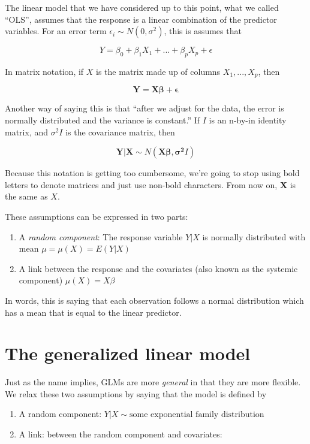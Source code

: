 \documentclass[openany]{book}
\begin{document}
The linear model that we have considered up to this point, what we called ``OLS'', assumes that the response is a linear combination of the predictor variables. For an error term \(\epsilon_i \sim N(0,\sigma^2)\), this is assumes that

\[
Y = \beta_0 + \beta_1 X_1 + ... + \beta_p X_p + \epsilon
\]

In matrix notation, if \(X\) is the matrix made up of columns \(X_1, ..., X_p\), then

\[
\mathbf{Y} = \mathbf{X} \mathbf{\beta} + \mathbf{\epsilon}
\]

Another way of saying this is that ``after we adjust for the data, the error is normally distributed and the variance is constant.'' If \(I\) is an n-by-in identity matrix, and \(\sigma^2 I\) is the covariance matrix, then

\[
\mathbf{Y|X} \sim N( \mathbf{X \beta}, \mathbf{\sigma^2} I)
\]

Because this notation is getting too cumbersome, we're going to stop using bold letters to denote matrices and just use non-bold characters. From now on, \(\mathbf{X}\) is the same as \(X\).

These assumptions can be expressed in two parts:

\begin{enumerate}
\def\labelenumi{\arabic{enumi}.}
\item
  A \emph{random component}: The response variable \(Y|X\) is normally distributed with mean \(\mu = \mu(X) = E(Y|X)\)
\item
  A link between the response and the covariates (also known as the systemic component) \(\mu(X) = X\beta\)
\end{enumerate}

In words, this is saying that each observation follows a normal distribution which has a mean that is equal to the linear predictor.

\hypertarget{the-generalized-linear-model}{%
\section{The generalized linear model}\label{the-generalized-linear-model}}

Just as the name implies, GLMs are more \emph{general} in that they are more flexible. We relax these two assumptions by saying that the model is defined by

\begin{enumerate}
\def\labelenumi{\arabic{enumi}.}
\item
  A random component: \(Y|X \sim \text{some exponential family distribution}\)
\item
  A link: between the random component and covariates:
\end{enumerate}
\end{document}
